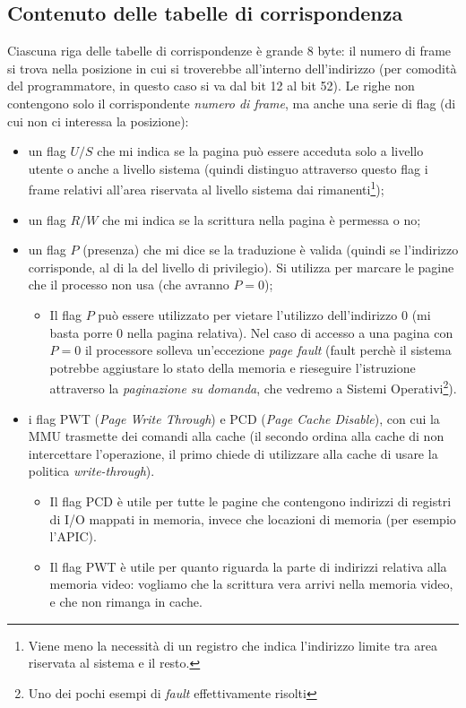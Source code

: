 \subsection{Contenuto delle tabelle di corrispondenza} Ciascuna riga delle tabelle di corrispondenze è grande 8 byte: il numero di frame si trova nella posizione in cui si troverebbe all'interno dell'indirizzo (per comodità del programmatore, in questo caso si va dal bit 12 al bit 52). Le righe non contengono solo il corrispondente \emph{numero di frame}, ma anche una serie di flag (di cui non ci interessa la posizione):
\begin{itemize}
	\item un flag $U/S$ che mi indica se la pagina può essere acceduta solo a livello utente o anche a livello sistema (quindi distinguo attraverso questo flag i frame relativi all'area riservata al livello sistema dai rimanenti\footnote{Viene meno la necessità di un registro che indica l'indirizzo limite tra area riservata al sistema e il resto.});
	\item un flag $R/W$ che mi indica se la scrittura nella pagina è permessa o no;
	\item un flag $P$ (presenza) che mi dice se la traduzione è valida (quindi se l'indirizzo corrisponde, al di la del livello di privilegio). Si utilizza per marcare le pagine che il processo non usa (che avranno $P=0$);
	\begin{itemize}
		\item Il flag $P$ può essere utilizzato per vietare l'utilizzo dell'indirizzo $0$ (mi basta porre $0$ nella pagina relativa). Nel caso di accesso a una pagina con $P=0$ il processore solleva un'eccezione \emph{page fault} (fault perchè il sistema potrebbe aggiustare lo stato della memoria e rieseguire l'istruzione attraverso la \emph{paginazione su domanda}, che vedremo a Sistemi Operativi\footnote{Uno dei pochi esempi di \emph{fault} effettivamente risolti}).
	\end{itemize}
	\item i flag PWT (\emph{Page Write Through}) e PCD (\emph{Page Cache Disable}), con cui la MMU trasmette dei comandi alla cache (il secondo ordina alla cache di non intercettare l'operazione, il primo chiede di utilizzare alla cache di usare la politica \emph{write-through}).
	\begin{itemize}
		\item Il flag PCD è utile per tutte le pagine che contengono indirizzi di registri di I/O mappati in memoria, invece che locazioni di memoria (per esempio l'APIC). 
		\item Il flag PWT è utile per quanto riguarda la parte di indirizzi relativa alla memoria video: vogliamo che la scrittura vera arrivi nella memoria video, e che non rimanga in cache.
	\end{itemize}
\end{itemize}


